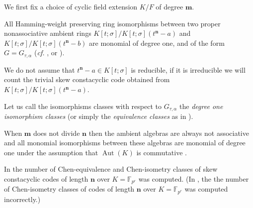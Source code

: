 \documentclass[11pt]{amsart}
\theoremstyle{plain}
\theoremstyle{definition}
\numberwithin{equation}{section}
\numberwithin{figure}{section}
\newcommand{\os}{{\mathbf{m}}}  %
\newcommand{\de}{{\mathbf{n}}}  %
\DeclareMathOperator{\Gal}{Gal}
\DeclareMathOperator{\Aut}{Aut}
\begin{document}
We first fix a choice of cyclic field extension $K/F$ of degree $\os$.



  All Hamming-weight preserving ring  isomorphisms between two proper nonassociative ambient rings  $K[t;\sigma]/K[t;\sigma](t^\de-a)$ and $K[t;\sigma]/K[t;\sigma](t^\de-b)$  are monomial of degree one, and of the form $G=G_{\tau,\alpha}$ (\emph{cf.} \cite[Corollary 6.2]{NevinsPumpluen2025submitted}, \cite[Theorem 4.2]{Pumpluen2025} or \cite[Theorem 2.3]{NevinsPumpluen2025submitted}).




 We do not assume that $t^\de-a\in K[t;\sigma]$ is reducible, if it is irreducible we will count the trivial skew constacyclic code obtained from $K[t;\sigma]/K[t;\sigma](t^\de-a)$.


Let us call the isomorphisms classes with respect to $G_{\tau,\alpha}$ the \emph{degree one
isomorphism classes} (or simply the  \emph{equivalence classes} as in \cite{Pumpluen2025}).






When $\os$ does not divide $\de$ then the ambient algebras are always not associative and all monomial isomorphisms between these algebras are monomial of degree one under the assumption that $\Aut(K)$ is commutative \cite[Corollary 6.2]{NevinsPumpluen2025submitted}.




In \cite{NevinsPumpluen2025submitted}  the number of Chen-equivalence and Chen-isometry classes of skew constacyclic codes of length $\de$ over $K=\mathbb{F}_{p^r}$ was computed.
(In \cite[Theorem 4]
{OuazzouNajmeddineAydin2025}, the  the number of Chen-isometry classes of codes of length $\de$ over $K=\mathbb{F}_{p^r}$ was computed incorrectly.)
\end{document}
